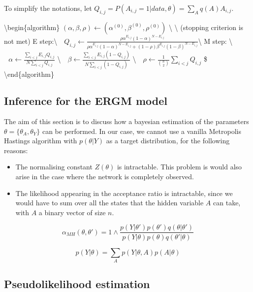 \documentclass[]{article}
\begin{document}
To simplify the notations, let
\(Q_{i,j}=P(A_{i,j}=1|data,\theta)=\sum_{A}{q(A)A_{i,j}}.\)

\textbackslash{}begin\{algorithm\}
\((\alpha,\beta, \rho) \leftarrow (\alpha^{(0)},\beta^{(0)}, \rho^{(0)})\)
\textbackslash{} \textbackslash{} \While(stopping criterion is not met)
\Do \Begin E step:\textbackslash{}
\(~~~Q_{i,j} \leftarrow \frac{\rho\alpha^{E_{i,j}}(1-\alpha)^{N-E_{i,j}}}{\rho\alpha^{E_{i,j}}(1-\alpha)^{N-E_{i,j}}+(1-\rho)\beta^{E_{i,j}}(1-\beta)^{N-E_{i,j}}}\)\textbackslash{}
M step: \textbackslash{} \Begin
\(~~~\alpha \leftarrow \frac{\sum_{i<j}E_{i,j}Q_{i,j}}{N\sum_{i<j}Q_{i,j}}\)
\textbackslash{}
\(~~~\beta \leftarrow \frac{\sum_{i<j}E_{i,j}(1-Q_{i,j})}{N\sum_{i<j}(1-Q_{i,j})}\)
\textbackslash{}
\(~~~\rho \leftarrow \frac{1}{{n \choose 2}}\sum_{i<j}Q_{i,j}\) \End
\End {}\$ \textbackslash{}end\{algorithm\}

\hypertarget{inference-for-the-ergm-model}{%
\subsection{Inference for the ERGM
model}\label{inference-for-the-ergm-model}}

The aim of this section is to discuss how a bayesian estimation of the
parameters \(\theta=\{\theta_A, \theta_Y\}\) can be performed. In our
case, we cannot use a vanilla Metropolis Hastings algorithm with
\(p(\theta|Y)\) as a target distribution, for the following reasons:

\begin{itemize}
\item
  The normalising constant \(Z(\theta)\) is intractable. This problem is
  would also arise in the case where the network is completely observed.
\item
  The likelihood appearing in the acceptance ratio is intractable, since
  we would have to sum over all the states that the hidden variable
  \(A\) can take, with \(A\) a binary vector of size \(n\).
\end{itemize}

\[\alpha_{MH}(\theta,\theta')= 1 \land \frac{p(Y|\theta')p(\theta')q(\theta|\theta')}{p(Y|\theta)p(\theta)q(\theta'|\theta)}\]

\[p(Y|\theta)=\sum_Ap(Y|\theta,A)p(A|\theta) \]

\hypertarget{pseudolikelihood-estimation}{%
\subsection{Pseudolikelihood
estimation}\label{pseudolikelihood-estimation}}
\end{document}
